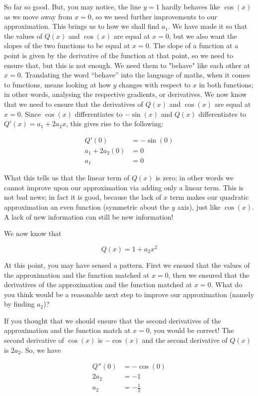 \documentclass{article}
\begin{document}
So far so good. But, you may notice, the line $y=1$ hardly behaves like $\cos(x)$ as we move away from $x=0$, so we need further improvements to our approximation. This brings us to how we shall find $a_1$. We have made it so that the values of $Q(x)$ and $\cos(x)$ are equal at $x=0$, but we also want the slopes of the two functions to be equal at $x=0$. The slope of a function at a point is given by the derivative of the function at that point, so we need to ensure that, but this is not enough. We need them to "behave" like each other at $x=0$.  Translating the word “behave” into the language of maths, when it comes to functions, means looking at how $y$ changes with respect to $x$ in both functions; in other words, analysing the respective gradients, or derivatives. We now know that we need to ensure that the derivatives of $Q(x)$ and $\cos(x)$ are equal at $x=0$. Since $\cos(x)$ differentiates to $-\sin(x)$ and $Q(x)$ differentiates to $Q'(x) = a_1 + 2a_2x$, this gives rise to the following:

\begin{align*}
    Q'(0) &= -\sin(0) \\
    a_1 + 2a_2(0) &= 0 \\
    a_1 &= 0
\end{align*}

What this tells us that the linear term of $Q(x)$ is zero; in other words we cannot improve upon our approximation via adding only a linear term. This is not bad news; in fact it is good, because the lack of $x$ term makes our quadratic approximation an even function (symmetric about the $y$ axis), just like $\cos(x)$. A lack of new information can still be new information!

We now know that

$$ Q(x) = 1 + a_2 x^2 $$

At this point, you may have sensed a pattern. First we ensued that the values of the approximation and the function matched at $x=0$, then we ensured that the derivatives of the approximation and the function matched at $x=0$. What do you think would be a reasonable next step to improve our approximation (namely by finding $a_2$)?

If you thought that we should ensure that the second derivatives of the approximation and the function match at $x=0$, you would be correct! The second derivative of $\cos(x)$ is $-\cos(x)$ and the second derivative of $Q(x)$ is $2a_2$. So, we have

\begin{align*}
    Q''(0) &= -\cos(0) \\
    2a_2 &= -1 \\
    a_2 &= -\frac{1}{2}
\end{align*}
\end{document}
